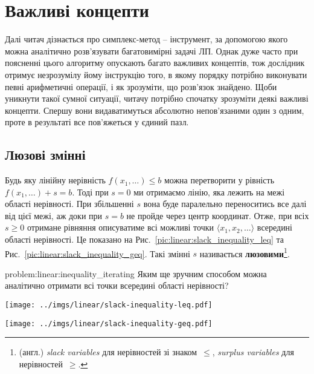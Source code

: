 \documentclass[\main/book.tex]{subfiles}
\begin{document}
\section{Важливі концепти}

Далі читач дізнається про симплекс-метод -- інструмент, за допомогою якого можна аналітично розв'язувати багатовимірні задачі ЛП. Однак дуже часто при поясненні цього алгоритму опускають багато важливих концептів, тож дослідник отримує незрозумілу йому інструкцію того, в якому порядку потрібно виконувати певні арифметичні операції, і як зрозуміти, що розв'язок знайдено. Щоби уникнути такої сумної ситуації, читачу потрібно спочатку зрозуміти деякі важливі концепти. Спершу вони видаватимуться абсолютно непов'язаними один з одним, проте в результаті все пов'яжеться у єдиний пазл.

\subsection{Люзові змінні}

Будь яку лінійну нерівність $f(x_1, \ldots) \leq b$ можна перетворити у рівність $f(x_1, \ldots) + s = b$. Тоді при ${s=0}$ ми отримаємо лінію, яка лежить на межі області нерівності. При збільшенні $s$ вона буде паралельно переноситись все далі від цієї межі, аж доки при $s=b$ не пройде через центр координат. Отже, при всіх $s \geq 0$ отримане рівняння описуватиме всі можливі точки $\langle x_1, x_2, \ldots \rangle$ всередині області нерівності. Це показано на Рис.~\ref{pic:linear:slack_inequality_leq} та Рис.~\ref{pic:linear:slack_inequality_geq}. Такі змінні $s$ називається \textbf{люзовими}\footnote{(англ.) \textit{slack variables} для нерівностей зі знаком~\flqq{}$\leq$\frqq{}, \textit{surplus variables} для нерівностей~\flqq{}$\geq$\frqq{}.}.

\begin{problem}{problem:linear:inequality_iterating}
 Яким ще зручним способом можна аналітично отримати всі точки всередині області нерівності?
\end{problem}

\begin{figure*}
 \centering
 \begin{minipage}[t]{.47\textwidth}
  \texttt{[image: ../imgs/linear/slack-inequality-leq.pdf]}
  \caption{Нерівність $x_1 + x_2 \leq 4$ утворює область, межу якої можна описати рівнянням $x_1 + x_2 + s = 4$ при $s=0$. При $s=b=4$ ця лі\-нія проходить через центр координат.}
  \label{pic:linear:slack_inequality_leq}
 \end{minipage}\qquad
 \begin{minipage}[t]{.47\textwidth}
  \texttt{[image: ../imgs/linear/slack-inequality-geq.pdf]}
  \caption{Для того, щоби отримати такий самий ефект для нерівностей \flqq{}$\geq$\frqq{}, змінну $s$ потрібно включити у рівняння прямої зі знаком~\flqq{}$-$\frqq{}.}
  \label{pic:linear:slack_inequality_geq}
 \end{minipage}
\end{figure*}
\end{document}

